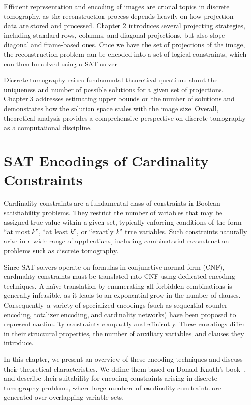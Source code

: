 \documentclass{report}
\begin{document}
{\setlength{\parskip}{1em}
Efficient representation and encoding of images are crucial topics in discrete tomography, as the reconstruction process depends heavily on how projection data are stored and processed. Chapter 2 introduces several projecting strategies, including standard rows, columns, and diagonal projections, but also slope-diagonal and frame-based ones. Once we have the set of projections of the image, the reconstruction problem can be encoded into a set of logical constraints, which can then be solved using a SAT solver}.


{\setlength{\parskip}{1em}
Discrete tomography raises fundamental theoretical questions about the uniqueness and number of possible solutions for a given set of projections. Chapter 3 addresses estimating upper bounds on the number of solutions and demonstrates how the solution space scales with the image size. Overall, theoretical analysis provides a comprehensive perspective on discrete tomography as a computational discipline}.

\chapter{SAT Encodings of Cardinality Constraints}
Cardinality constraints are a fundamental class of constraints in Boolean satisfiability problems. They restrict the number of variables that may be assigned true value within a given set, typically enforcing conditions of the form ``at most \(k\)'', ``at least \(k\)'', or ``exactly \(k\)'' true variables. Such constraints naturally arise in a wide range of applications, including combinatorial reconstruction problems such as discrete tomography.

Since SAT solvers operate on formulas in conjunctive normal form (CNF), cardinality constraints must be translated into CNF using dedicated encoding techniques. A naïve translation by enumerating all forbidden combinations is generally infeasible, as it leads to an exponential grow in the number of clauses. Consequently, a variety of specialized encodings (such as sequential counter encoding, totalizer encoding, and cardinality networks) have been proposed to represent cardinality constraints compactly and efficiently. These encodings differ in their structural properties, the number of auxiliary variables, and clauses they introduce.

In this chapter, we present an overview of these encoding techniques and discuss their theoretical characteristics. We define them based on Donald Knuth's book~\cite{knuth2015taocp4f6}, and describe their suitability for encoding constraints arising in discrete tomography problems, where large numbers of cardinality constraints are generated over overlapping variable sets.
\end{document}
